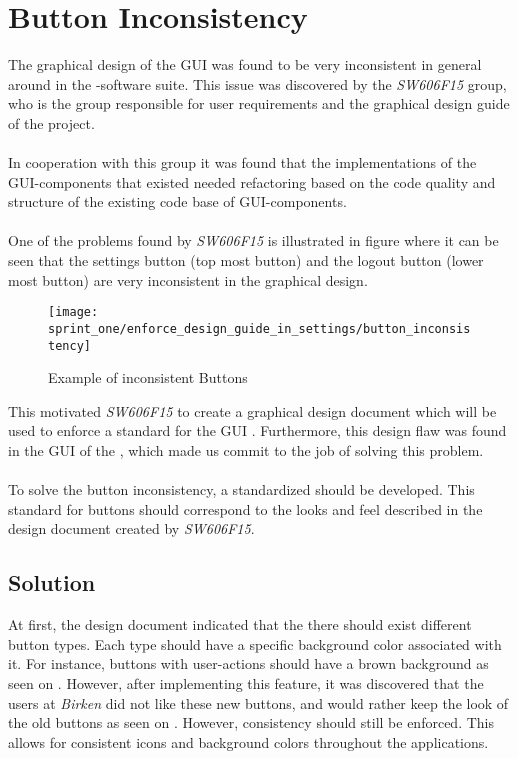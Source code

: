 \section{Button Inconsistency}
\label{sub:button_inconsistency}

The graphical design of the GUI was found to be very inconsistent in general around in the \giraf-software suite. This issue was discovered by the \emph{SW606F15} group, who is the group responsible for user requirements and the graphical design guide of the project.
\\\\
In cooperation with this group it was found that the implementations of the GUI-components that existed needed refactoring based on the code quality and structure of the existing code base of GUI-components.
\\\\
One of the problems found by \emph{SW606F15} is illustrated in figure  where it can be seen that the settings button (top most button) and the logout button (lower most button) are very inconsistent in the graphical design. 

\begin{figure}[!htbp]
    \centering
    \texttt{[image: sprint\_one/enforce\_design\_guide\_in\_settings/button\_inconsistency]}
    \caption{Example of inconsistent Buttons}
    \label{fig:button_inconsistency}
\end{figure}

This motivated \emph{SW606F15} to create a graphical design document which will be used to enforce a standard for the GUI . Furthermore, this design flaw was found in the GUI of the \launcher, which made us commit to the job of solving this problem. 
\\\\
To solve the button inconsistency, a standardized should be developed. This standard for buttons should correspond to the looks and feel described in the design document created by \emph{SW606F15}. 

\subsection{Solution}
\label{sub:solution}

At first, the design document indicated that the there should exist different button types. Each type should have a specific background color associated with it. For instance, buttons with user-actions should have a brown background as seen on . However, after implementing this feature, it was discovered that the users at \emph{Birken} did not like these new buttons, and would rather keep the look of the old buttons as seen on . However, consistency should still be enforced. This allows for consistent icons and background colors throughout the applications.\\

